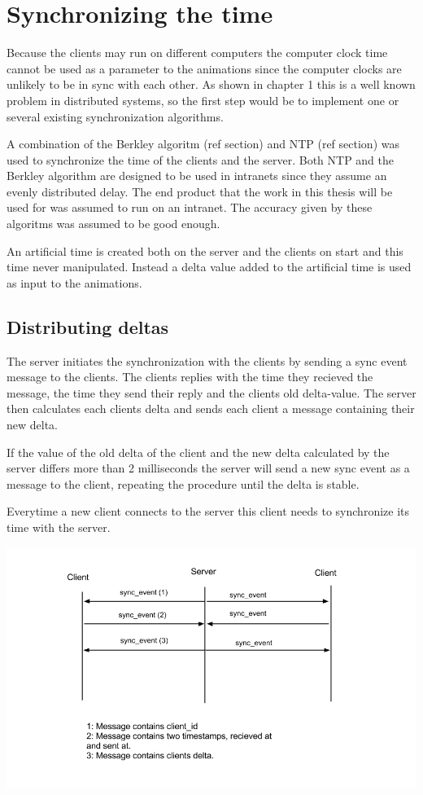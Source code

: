 \section{Synchronizing the time}

Because the clients may run on different computers the computer clock time cannot be used as a parameter to the animations since the computer clocks are unlikely to be in sync with each other. As shown in chapter 1 this is a well known problem in distributed systems, so the first step would be to implement one or several existing synchronization algorithms. 

A combination of the Berkley algoritm (ref section) and NTP (ref section) was used to synchronize the time of the clients and the server. Both NTP and the Berkley algorithm are designed to be used in intranets since they assume an evenly distributed delay. The end product that the work in this thesis will be used for was assumed to run on an intranet. The accuracy given by these algoritms was assumed to be good enough. 

An artificial time is created both on the server and the clients on start and this time never manipulated. Instead a delta value added to the artificial time is used as input to the animations.  

\subsection {Distributing deltas}

The server initiates the synchronization with the clients by sending a sync event message to the clients. The clients replies with the time they recieved the message, the time they send their reply and the clients old delta-value. The server then calculates each clients delta and sends each client a message containing their new delta. 

If the value of the old delta of the client and the new delta calculated by the server differs more than 2 milliseconds the server will send a new sync event as a message to the client, repeating the procedure until the delta is stable. 

Everytime a new client connects to the server this client needs to synchronize its time with the server. 

\includegraphics[width=1.0\textwidth]{figures/comm.png}

